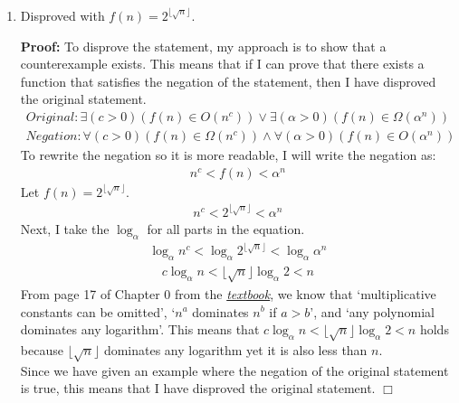 \documentclass[11pt]{article}
\def\endproofmark{$\Box$}
\newenvironment{proof}{\par{\bf Proof:}}{\endproofmark\smallskip}
\begin{document}
\begin{enumerate}[label=(\alph*)]
\item
Disproved with $f(n) = 2^{\lfloor\sqrt{n}\rfloor}$.
\begin{proof}
To disprove the statement, my approach is to show that a counterexample exists. This means that if I can prove that there exists a function that satisfies the negation of the statement, then I have disproved the original statement. \\
\begin{align*}
Original: \exists (c > 0) (f(n) \in O(n^c)) \lor \exists (\alpha > 0) (f(n) \in \Omega(\alpha^n))
\end{align*}
\begin{align*}
Negation: \forall (c > 0) (f(n) \in \Omega(n^c)) \land \forall (\alpha > 0) (f(n) \in O(\alpha^n))
\end{align*}
To rewrite the negation so it is more readable, I will write the negation as: \\
\begin{align*}
n^c < f(n) < \alpha^n
\end{align*}
Let $f(n) = 2^{\lfloor\sqrt{n}\rfloor}$. \\
\begin{align*}
n^c < 2^{\lfloor\sqrt{n}\rfloor} < \alpha^n
\end{align*}
Next, I take the $\log_\alpha$ for all parts in the equation. \\
\begin{align*}
\log_\alpha{n^c} < \log_\alpha{2^{\lfloor\sqrt{n}\rfloor}} < \log_\alpha{\alpha^n}
\end{align*}
\begin{align*}
c\log_\alpha{n} < \lfloor\sqrt{n}\rfloor\log_\alpha{2} < n
\end{align*}
From page 17 of Chapter 0 from the \href{https://people.eecs.berkeley.edu/~vazirani/algorithms/chap0.pdf}{\textit{textbook}}, we know that `multiplicative constants can be omitted', `$n^a$ dominates $n^b$ if $a > b$', and `any polynomial dominates any logarithm'. This means that $c\log_\alpha{n} < \lfloor\sqrt{n}\rfloor\log_\alpha{2} < n$ holds because $\lfloor\sqrt{n}\rfloor$ dominates any logarithm yet it is also less than $n$. \\
Since we have given an example where the negation of the original statement is true, this means that I have disproved the original statement.
\end{proof}
\end{enumerate}
\end{document}
